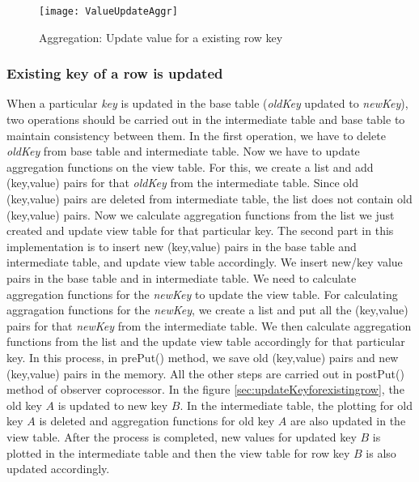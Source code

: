 \documentclass[11pt,a4paper,bibtotoc,idxtotoc,headsepline,footsepline,footexclude,BCOR12mm,DIV13]{scrbook}
\begin{document}
\begin{figure}
    \centering
    \texttt{[image: ValueUpdateAggr]}
    \caption{Aggregation: Update value for a existing row key}
    \label{sec:updatevalueforexistingkey}
    
\end{figure}  


\subsubsection{Existing key of a row is updated}
\label{subsubsec:keyupdate}

When a particular \emph{key} is updated in the base table (\emph{oldKey} updated to \emph{newKey}), two operations should be carried out in the intermediate table and base table to maintain consistency between them. In the first operation, we have to delete \emph{oldKey} from base table and intermediate table. Now we have to update aggregation functions on the view table. For this, we create a list and add (key,value) pairs for that \emph{oldKey} from the intermediate table. Since old (key,value) pairs are deleted from intermediate table, the list does not contain old (key,value) pairs. Now we calculate aggregation functions from the list we just created and update view table for that particular key. The second part in this implementation is to insert new (key,value) pairs in the base table and intermediate table, and update view table accordingly. We insert new/key value pairs in the base table and in intermediate table. We need to calculate aggregation functions for the \emph{newKey} to update the view table. For calculating aggragation functions for the \emph{newKey}, we create a list and put all the (key,value) pairs for that \emph{newKey} from the intermediate table. We then calculate aggregation functions from the list and the update view table accordingly for that particular key. In this process, in prePut() method, we save old (key,value) pairs and new (key,value) pairs in the memory. All the other steps are carried out in postPut() method of observer coprocessor. In the figure \ref{sec:updateKeyforexistingrow}, the old key $A$ is updated to new key $B$. In the intermediate table, the plotting for old key $A$ is deleted and aggregation functions for old key $A$ are also updated in the view table. After the process is completed, new values for updated key $B$ is plotted in the intermediate table and then the view table for row key $B$ is also updated accordingly.

\end{document}
